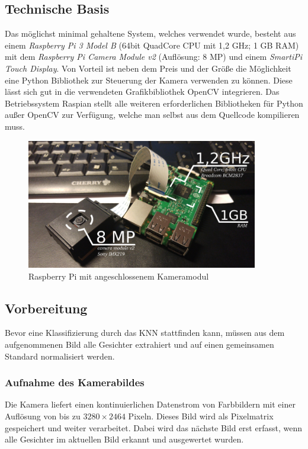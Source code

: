 \documentclass[12pt, a4paper]{article}
\begin{document}
\subsection{Technische Basis}
Das möglichst minimal gehaltene System, welches verwendet wurde, besteht aus einem \textit{Raspberry Pi 3 Model B} (64bit QuadCore CPU mit 1,2 GHz; 1 GB RAM) mit dem \textit{Raspberry Pi Camera Module v2} (Auflösung: 8 MP) und einem \textit{SmartiPi Touch Display}. Von Vorteil ist neben dem Preis und der Größe die Möglichkeit eine Python Bibliothek zur Steuerung der Kamera verwenden zu können. Diese lässt sich gut in die verwendeten Grafikbibliothek OpenCV integrieren. Das Betriebssystem Raspian stellt alle weiteren erforderlichen Bibliotheken für Python außer OpenCV zur Verfügung, welche man selbst aus dem Quellcode kompilieren muss.

\begin{figure}
	\centering
	\includegraphics[width=0.9\textwidth]{raspi_camera}
	\caption{Raspberry Pi mit angeschlossenem Kameramodul}
\end{figure}

\subsection{Vorbereitung}
Bevor eine Klassifizierung durch das KNN stattfinden kann, müssen aus dem aufgenommenen Bild alle Gesichter extrahiert und auf einen gemeinsamen Standard normalisiert werden.

\subsubsection{Aufnahme des Kamerabildes}
Die Kamera liefert einen kontinuierlichen Datenstrom von Farbbildern mit einer Auflösung von bis zu \(3280 \times 2464\) Pixeln.\cite{raspberrypi:camera} Dieses Bild wird als Pixelmatrix gespeichert und weiter verarbeitet. Dabei wird das nächste Bild erst erfasst, wenn alle Gesichter im aktuellen Bild erkannt und ausgewertet wurden.
\end{document}
